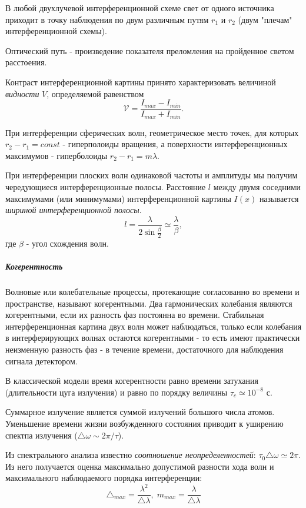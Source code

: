 \documentclass[12pt]{article}
\begin{document}
		В любой двухлучевой интерференционной схеме свет от одного источника приходит в точку наблюдения
		по двум различным путям $r_1$ и $r_2$ (двум "плечам" интерференционной
		схемы).
		
		Оптический путь - произведение показателя преломления на пройденное светом расстоения. 
		
		Контраст интерференционной картины принято характеризовать величиной \textit{видности} $V$, определяемой равенством
		\begin{equation}
		\label{vidnost}
		\mathcal{V} = \dfrac{I_{max} - I_{min}}{I_{max} + I_{min}}.
		\end{equation}
		
		При интерференции сферических волн, геометрическое место точек, для которых $r_2 - r_1 = const$ - гиперполоиды вращения, а поверхности интерференционных максимумов - гиперболоиды $r_2-r_1 = m\lambda$.
		
		При интерференции плоских волн одинаковой частоты и амплитуды мы получим чередующиеся интерференционные полосы. Расстояние $l$ между двумя соседними максимумами (или минимумами)
		интерференционной картины $I(x)$ называется \textit{шириной интерференционной полосы}.
		\begin{equation}\label{eq::inter_width}
		l = \dfrac{\lambda}{2\sin \frac{\beta}{2}} \simeq \dfrac{\lambda}{\beta},
		\end{equation}
		где $\beta$ - угол схождения волн.
		
		\subparagraph{Когерентность}
		Волновые или колебательные процессы, протекающие согласованно
		во времени и пространстве, называют когерентными. Два гармонических колебания являются когерентными, если их разность фаз постоянна во времени. Стабильная интерференционная картина двух волн может наблюдаться, только если колебания в интерферирующих волнах остаются когерентными - то есть имеют практически неизменную
		разность фаз - в течение времени, достаточного для наблюдения сигнала детектором.
		
		В классической модели время когерентности равно времени затухания (длительности цуга излучения) и равно по порядку величины $\tau_c \simeq 10^{-8}$ с. 
		
		Суммарное излучение является суммой излучений большого числа атомов. Уменьшение времени жизни возбужденного состояния приводит к уширению спектпа излучения ($\triangle \omega \sim 2\pi/\tau$).
		
		Из спектрального анализа известно \textit{соотношение неопределенностей}: $\tau_0\triangle\omega \simeq 2\pi$. Из него получается оценка максимально допустимой разности хода волн и максимального наблюдаемого	порядка интерференции:
		\begin{equation}
		\triangle_{max} = \dfrac{\lambda^2}{\triangle\lambda}, \; m_{max} = \dfrac{\lambda}{\triangle\lambda}
		\end{equation}
		
\end{document}
